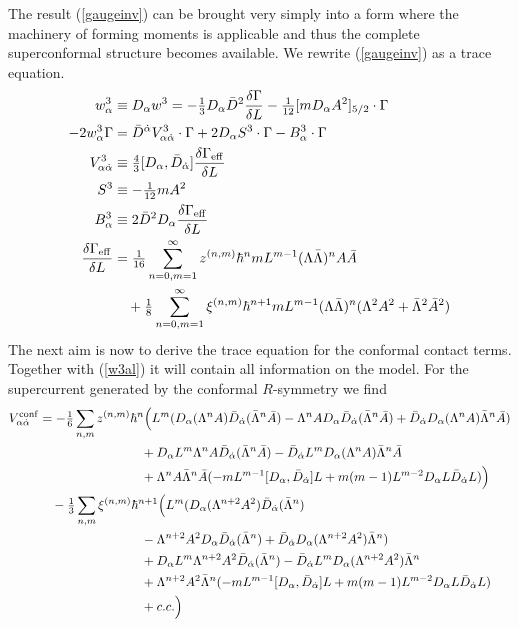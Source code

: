 \documentclass[a4paper,12pt]{article}
\newcommand{\Geff}{\Gamma_{\rm eff}}
\newcommand{\al}{\alpha}
\newcommand{\da}{{\dot\alpha}}
\newcommand{\tfr}[2]{{\textstyle \frac{#1}{#2}}}
\newcommand{\fdq}[2]{\frac{\delta #1}{\delta #2}}
\begin{document}
The result (\ref{gaugeinv}) can be brought very simply into a form where
the machinery of forming moments is applicable and thus the complete
superconformal structure becomes available.
We rewrite (\ref{gaugeinv}) as a trace equation.
\begin{align}
w_\al^3 &\equiv D_\al w^3 = -\tfr{1}{3} D_\al \bar D^2 \fdq{\Gamma}{L}
-\tfr{1}{12} [m D_\al A^2]_{5/2}\cdot\Gamma\\
-2  w_\al^3 \Gamma &=  \bar D^\da V^3_{\al\da}\cdot \Gamma 
+ 2 D_\al S^3 \cdot \Gamma -
B^3_\al \cdot\Gamma
\label{w3al}
\\
V_{\al\da}^3 &\equiv \tfr{4}{3} [D_\al, \bar D_\da] \fdq{\Geff}{L} \\
S^3 &\equiv -\tfr{1}{12} mA^2\\
B_\al^3 &\equiv  2 \bar D^2 D_\al \fdq{\Geff}{L}\\
\fdq{\Geff}{L} &=\tfr{1}{16}\sum_{n=0,m=1}^\infty z^{(n,m)} \hbar^n m L^{m-1}
(\Lambda \bar \Lambda)^n A \bar A \nonumber \\
& \quad + \tfr{1}{8} \sum_{n=0,m=1}^\infty \xi^{(n,m)} \hbar^{n+1} m
L^{m-1} (\Lambda\bar \Lambda)^n (\Lambda^2 A^2 + \bar \Lambda^2 \bar A^2)\end{align}
The next aim is now to derive the trace equation for the conformal contact
terms. Together with (\ref{w3al}) it will contain all information on the
model. 
For the supercurrent generated by the conformal $R$-symmetry we find
\begin{align}
V_{\al\da}^{\rm conf} &= -\tfr{1}{6} \sum_{n,m} z^{(n,m)} \hbar^n \Bigl(
L^m (D_\al (\Lambda^n A) \bar D_\da (\bar \Lambda^n \bar A) - \Lambda^n A D_\al \bar
D_\da (\bar \Lambda^n \bar A) + \bar D_\da D_\al (\Lambda^n A) \bar \Lambda^n \bar A )
\nonumber \\
& \qquad \qquad \qquad \quad \quad
+ D_\al L^m \Lambda^n A \bar D_\da (\bar \Lambda^n \bar A)
 - \bar D_\da L^m D_\al (\Lambda^n
A) \bar \Lambda^n \bar A \nonumber \\
& \qquad \qquad \qquad  \quad \quad
+ \Lambda^n A \bar \Lambda^n \bar A (-m L^{m-1} [D_\al, \bar D_\da] L + m(m-1) L^{m-2}
D_\al L \bar D_\da L ) \Bigr) \nonumber \\
& \quad -\tfr{1}{3} \sum_{n,m} \xi^{(n,m)} \hbar^{n+1} \Bigl(
L^m (D_\al (\Lambda^{n+2} A^2) \bar D_\da (\bar \Lambda^n)
\nonumber \\
& \qquad \qquad \qquad \quad \quad
 - \Lambda^{n+2} A^2 D_\al \bar
D_\da (\bar \Lambda^n) + \bar D_\da D_\al (\Lambda^{n+2} A^2) \bar \Lambda^n)
\nonumber \\
& \qquad \qquad \qquad \quad \quad
+ D_\al L^m \Lambda^{n+2} A^2 \bar D_\da (\bar \Lambda^n) - \bar D_\da L^m D_\al (\Lambda^{n+2}
A^2) \bar \Lambda^n \nonumber \\
& \qquad \qquad \qquad  \quad \quad
+ \Lambda^{n+2} A^2 \bar \Lambda^n  (-m L^{m-1} [D_\al, \bar D_\da] L + m(m-1) L^{m-2}
D_\al L \bar D_\da L ) 
\nonumber \\
& \qquad \qquad \qquad \quad \quad
+ c.c. \Bigr) 
\end{align}
\end{document}
